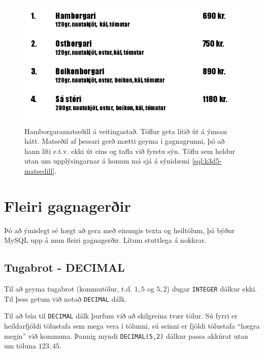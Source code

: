 \begin{figure}
\caption[Matseðill]{Hamborgaramatseðill á veitingastað. Töflur geta litið út á ýmsan hátt. Matseðil af þessari gerð mætti geyma í gagnagrunni, þó að hann líti e.t.v. ekki út eins og tafla við fyrstu sýn. Töflu sem heldur utan um upplýsingarnar á honum má sjá á sýnidæmi \ref{sql:k3d5-matsedill}. }
\label{mynd:matsedill}
\includegraphics[width=\textwidth]{myndir/matsedill}
\end{figure}

\begin{example}
\caption[Matseðill]{SQL-framsetning á matseðlinum á mynd \ref{mynd:matsedill}. Við gerum ráð fyrir að lýsingin á réttinum þurfi meira pláss en nafn hans.}
\label{sql:k3d5-matsedill}
\centering
{}
\end{example}

\section{Fleiri gagnagerðir}
Þó að ýmislegt sé hægt að gera með einungis texta og heiltölum, þá býður MySQL upp á mun fleiri gagnagerðir. Lítum stuttlega á nokkrar.
\subsection{Tugabrot - DECIMAL}
Til að geyma tugabrot (kommutölur, t.d. $1,5$ og $5,2$) dugar \verb|INTEGER| dálkur ekki. Til þess getum við notað \verb|DECIMAL| dálk.

Til að búa til \verb|DECIMAL| dálk þurfum við að skilgreina tvær tölur. Sú fyrri er heildarfjöldi tölustafa sem mega vera í tölunni, sú seinni er fjöldi tölustafa ``hægra megin'' við kommuna. Þannig myndi \verb|DECIMAL(5,2)| dálkur passa akkúrat utan um töluna $123,45$.

